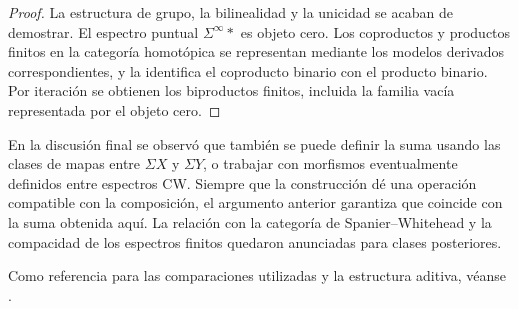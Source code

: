 \begin{proof}
La estructura de grupo, la bilinealidad y la unicidad se acaban de demostrar. El espectro puntual $\Sigma^\infty *$ es objeto cero. Los coproductos y productos finitos en la categoría homotópica se representan mediante los modelos derivados correspondientes, y la  identifica el coproducto binario con el producto binario. Por iteración se obtienen los biproductos finitos, incluida la familia vacía representada por el objeto cero.
\end{proof}

En la discusión final se observó que también se puede definir la suma usando las clases de mapas entre $\Sigma X$ y $\Sigma Y$, o trabajar con morfismos eventualmente definidos entre espectros CW. Siempre que la construcción dé una operación compatible con la composición, el argumento anterior garantiza que coincide con la suma obtenida aquí. La relación con la categoría de Spanier--Whitehead y la compacidad de los espectros finitos quedaron anunciadas para clases posteriores.

Como referencia para las comparaciones utilizadas y la estructura aditiva, véanse \cite[\S\S~2.4.2, 2.4.4--2.4.5 y Teorema~3.2.1.5]{malkiewich}.
